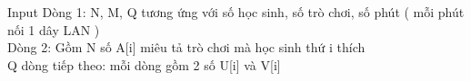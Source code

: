 Input
Dòng 1: N, M, Q tương ứng với số học sinh, số trò chơi, số phút ( mỗi phút nối 1 dây LAN )
\\Dòng 2: Gồm N số A[i] miêu tả trò chơi mà học sinh thứ i thích
\\Q dòng tiếp theo: mỗi dòng gồm 2 số U[i] và V[i]